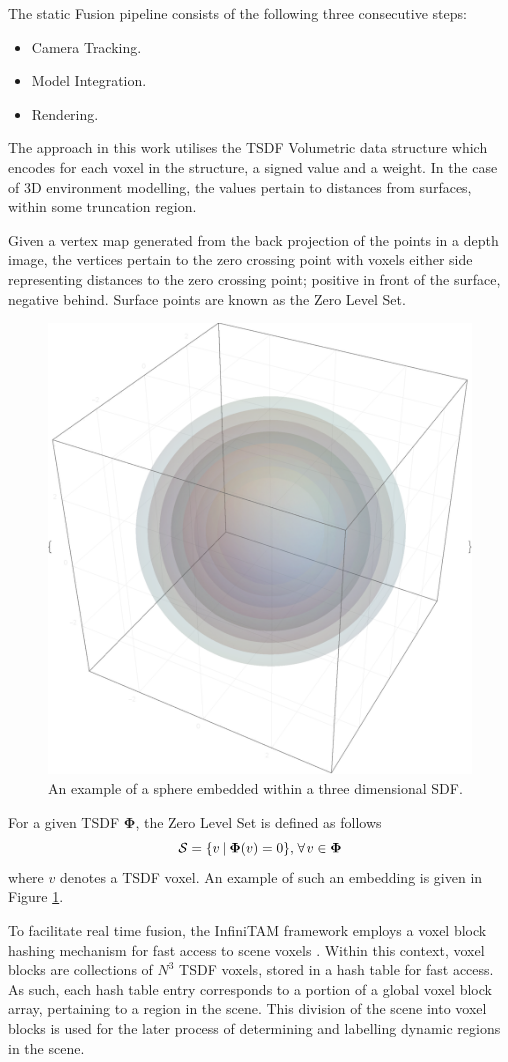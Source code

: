 The static Fusion pipeline consists of the following three consecutive steps:
\begin{itemize}
  \item Camera Tracking.
  \item Model Integration.
  \item Rendering.
\end{itemize}

The approach in this work utilises the TSDF Volumetric data structure which
encodes for each voxel in the structure, a signed value and a weight.
In the case of 3D environment modelling, the values pertain to distances from
surfaces, within some truncation region.

Given a vertex map generated from the back projection of the points in a depth
image, the vertices pertain to the zero crossing point with voxels either side
representing distances to the zero crossing point; positive in front of the
surface, negative behind. Surface points are known as the Zero Level Set.
\begin{figure}[h]
  \label{fig:sdf_example}
  \centering
  \includegraphics[width=.5\linewidth]{figures/moseg/3d_sdf.eps}
  \caption[Signed Distance Function]{An example of a sphere embedded within a 
  three dimensional SDF.}
\end{figure}

For a given TSDF $\mathbf{\Phi}$, the Zero Level Set is defined as follows
\begin{equation}
  \label{eqn:zero_level_definition}
  \mathcal{S} = \{v \:\vert\: \mathbf{\Phi}(v) = 0\}, 
  \mkern2mu \forall \mkern2mu v \in \mathbf{\Phi}
\end{equation}
where $v$ denotes a TSDF voxel. An example of such an embedding is given in
Figure \ref{fig:sdf_example}.

To facilitate real time fusion, the InfiniTAM framework employs a voxel block
hashing mechanism for fast access to scene voxels \cite{NieBner2013}. Within
this context, voxel blocks are collections of $N^{3}$ TSDF voxels, stored in a 
hash table for fast access. As such, each hash table entry corresponds to a portion 
of a global voxel block array, pertaining to a region in the scene. This division 
of the scene into voxel blocks is used for the later process of determining and 
labelling dynamic regions in the scene.

